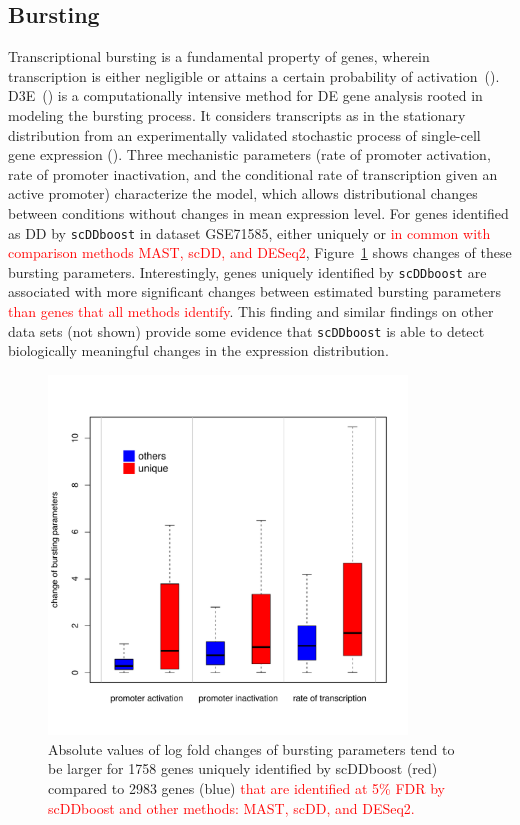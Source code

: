 \documentclass[aoas,preprint]{imsart}
\begin{document}
\subsection{Bursting}


Transcriptional bursting is a fundamental property of genes, wherein transcription is either
negligible or attains a certain probability of activation~(\cite{Raj:2008aa}). 
D3E~(\cite{ref:d3e}) is a computationally intensive 
method for DE gene analysis rooted in modeling the bursting process. It 
considers transcripts as in the stationary distribution from an 
experimentally validated stochastic process of single-cell gene expression (\cite{Peccoud:1995aa}). 
Three mechanistic parameters (rate of promoter activation, rate of promoter inactivation, 
 and the conditional rate of transcription given an active  promoter) characterize the model, which allows
 distributional changes between conditions without changes in mean expression level.
For genes identified as DD by \verb+scDDboost+ in dataset GSE71585, either uniquely or
\textcolor{red}{in common with
comparison methods MAST, scDD, and DESeq2}, 
Figure~\ref{fig:bursting} shows  changes of these bursting parameters. Interestingly, 
 genes uniquely identified by \verb+scDDboost+ are associated with more 
significant changes between estimated bursting parameters \textcolor{red}{than genes that all methods identify}.
This finding and similar findings on other data sets (not shown) provide some evidence that \verb+scDDboost+
is able to detect biologically meaningful changes in the expression distribution.

\begin{figure}[H]
\includegraphics[width = 0.85\textwidth]{Figs/D3E_box.pdf}
\caption{ Absolute values of log fold changes of bursting parameters tend to be larger for 1758 genes uniquely identified by scDDboost (red) compared to 2983 genes (blue) \textcolor{red}{that are  identified  at 5\% FDR by 
scDDboost and other methods: MAST, scDD, and DESeq2.} }
 \label{fig:bursting}
\end{figure}
\end{document}
